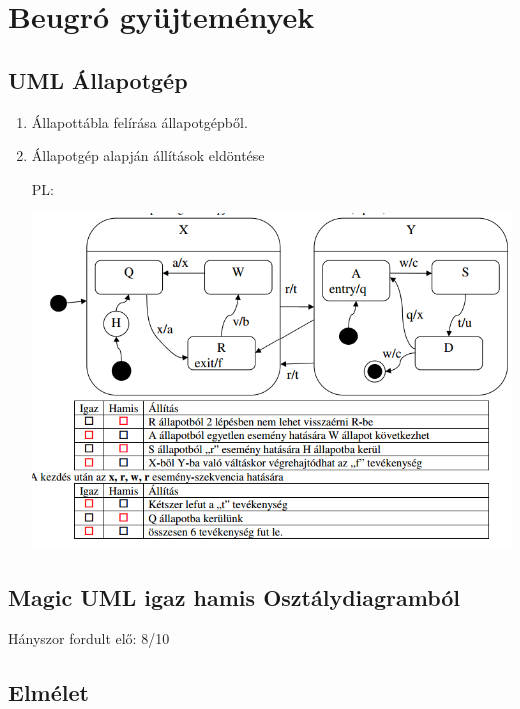 
\section{Beugró gyüjtemények}

\subsection{UML Állapotgép}

	\begin{enumerate}
		\item Állapottábla felírása állapotgépből.

		\item Állapotgép alapján állítások eldöntése

			PL:

				\begin{center}
					\includegraphics[scale=0.7]{img/table5}
				\end{center}
	\end{enumerate}

\subsection{Magic UML igaz hamis Osztálydiagramból}

	Hányszor fordult elő: 8/10
\subsection{Elmélet}

